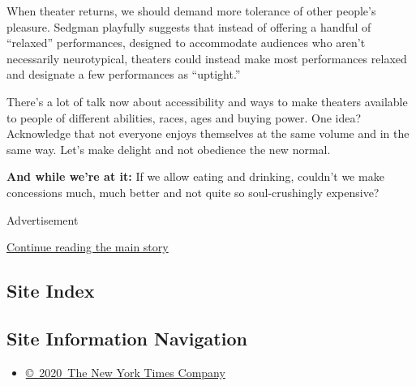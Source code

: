 When theater returns, we should demand more tolerance of other people's
pleasure. Sedgman playfully suggests that instead of offering a handful
of ``relaxed'' performances, designed to accommodate audiences who
aren't necessarily neurotypical, theaters could instead make most
performances relaxed and designate a few performances as ``uptight.''

There's a lot of talk now about accessibility and ways to make theaters
available to people of different abilities, races, ages and buying
power. One idea? Acknowledge that not everyone enjoys themselves at the
same volume and in the same way. Let's make delight and not obedience
the new normal.

\textbf{And while we're at it:} If we allow eating and drinking,
couldn't we make concessions much, much better and not quite so
soul-crushingly expensive?

Advertisement

\protect\hyperlink{after-bottom}{Continue reading the main story}

\hypertarget{site-index}{%
\subsection{Site Index}\label{site-index}}

\hypertarget{site-information-navigation}{%
\subsection{Site Information
Navigation}\label{site-information-navigation}}

\begin{itemize}
\tightlist
\item
  \href{https://help.nytimes3xbfgragh.onion/hc/en-us/articles/115014792127-Copyright-notice}{©~2020~The
  New York Times Company}
\end{itemize}

